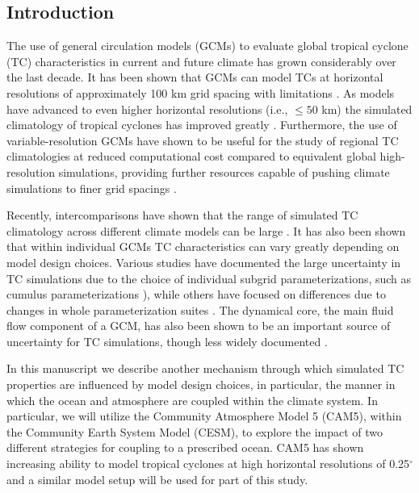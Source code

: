 \documentclass[draft,ms]{AGUTeX}
\newcommand{\degree}{$^{\circ}$}
\begin{document}
\begin{article}

\section{Introduction}

The use of general circulation models (GCMs) to evaluate global tropical cyclone (TC) characteristics in current and future climate has grown considerably over the last decade.  It has been shown that GCMs can model TCs at horizontal resolutions of approximately 100 km grid spacing with limitations \citep[e.g.,][]{Bengtsson2007a,Knutson2010,Strachan2013}. As models have advanced to even higher horizontal resolutions (i.e., $\le 50$ km) the simulated climatology of tropical cyclones has improved greatly \citep[e.g.,][]{Oouchi2006,Zhao2009,Murakami2012,Manganello2012,Satoh2012,Bacmeister2014,Wehner2014,Reed2015}. Furthermore, the use of variable-resolution GCMs have shown to be useful for the study of regional TC climatologies at reduced computational cost compared to equivalent global high-resolution simulations, providing further resources capable of pushing climate simulations to finer grid spacings \citep{Zarzycki2014,Zarzycki2014AMIPTCs}.  

Recently, intercomparisons have shown that the range of simulated TC climatology across different climate models can be large \citep{Camargo2013CMIP,Walsh2015CLIVAR}.  It has also been shown that within individual GCMs TC characteristics can vary greatly depending on model design choices. Various studies have documented the large uncertainty in TC simulations due to the choice of individual subgrid parameterizations, such as cumulus parameterizations \citep[e.g.,][]{Kim2012,Reed2011CAMPhysics,Lim2014TCconv}), while others have focused on differences due to changes in whole parameterization suites \citep{Reed2011c,Bacmeister2014}. The dynamical core, the main fluid flow component of a GCM, has also been shown to be an important source of uncertainty for TC simulations, though less widely documented \citep{ReedSimplePhys,Zhao2012,Reed2015}.

In this manuscript we describe another mechanism through which simulated TC properties are influenced by model design choices, in particular, the manner in which the ocean and atmosphere are coupled within the climate system. In particular, we will utilize the Community Atmosphere Model 5 (CAM5), within the Community Earth System Model (CESM), to explore the impact of two different strategies for coupling to a prescribed ocean. CAM5 has shown increasing ability to model tropical cyclones at high horizontal resolutions of 0.25\degree{} \citep{Bacmeister2014,Wehner2014,Wehner2015,Reed2015} and a similar model setup will be used for part of this study.


\end{article}
\end{document}
